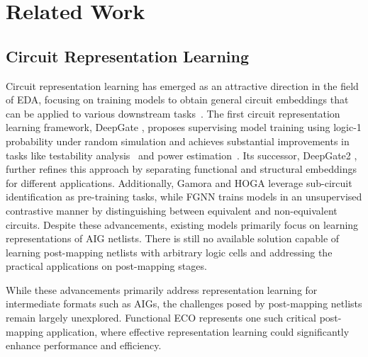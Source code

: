 \section{Related Work} \label{Sec:Related}
\subsection{Circuit Representation Learning}
Circuit representation learning has emerged as an attractive direction in the field of EDA, focusing on training models to obtain general circuit embeddings that can be applied to various downstream tasks~\cite{chen2024large}. The first circuit representation learning framework, DeepGate \cite{li2022deepgate}, proposes supervising model training using logic-1 probability under random simulation and 
achieves substantial improvements in tasks like testability analysis~\cite{shi2022deeptpi} and power estimation~\cite{khan2024deepseq}.  Its successor, DeepGate2 \cite{shi2023deepgate2}, further refines this approach by separating functional and structural embeddings for different applications. Additionally, Gamora \cite{wu2023gamora} and HOGA \cite{deng2024less} leverage sub-circuit identification as pre-training tasks, while FGNN \cite{wang2022functionality} trains models in an unsupervised contrastive manner by distinguishing between equivalent and non-equivalent circuits. Despite these advancements, existing models primarily focus on learning representations of AIG netlists. There is still no available solution capable of learning post-mapping netlists with arbitrary logic cells and addressing the practical applications on post-mapping stages. 

While these advancements primarily address representation learning for intermediate formats such as AIGs, the challenges posed by post-mapping netlists remain largely unexplored. Functional ECO represents one such critical post-mapping application, where effective representation learning could significantly enhance performance and efficiency.

